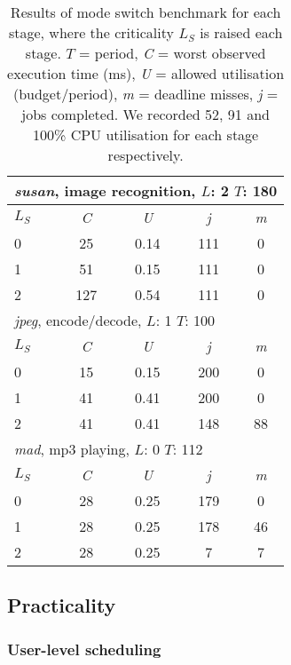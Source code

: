 \begin{table}[h]\centering
    \begin{tabular}{|l|c|c|c|c|}\hline
        \multicolumn{5}{|l|}{\textit{susan}, image recognition, \(L\): 2 \(T\): 180}\\\hline
        \textbf{\(L_S\)} & \textit{C} & \textit{U} & \textit{j} & \textit{m} \\\hline
                     0 & 25 & 0.14 & 111 & 0 \\\hline
                     1 & 51 & 0.15 & 111 & 0 \\\hline
                     2 & 127 & 0.54 & 111 & 0 \\\hline
        \multicolumn{5}{|l|}{\textit{jpeg}, encode/decode, \(L\): 1 \(T\): 100}\\\hline
        \textbf{\(L_S\)} & \textit{C} & \textit{U} & \textit{j} & \textit{m} \\\hline
                     0 & 15 & 0.15 & 200 & 0 \\\hline
                1 & 41 & 0.41 & 200 & 0 \\\hline
                     2 & 41 & 0.41 & 148 & 88 \\\hline
        \multicolumn{5}{|l|}{\textit{mad}, mp3 playing, \(L\): 0 \(T\): 112}\\\hline
        \textbf{\(L_S\)} & \textit{C} & \textit{U} & \textit{j} & \textit{m} \\\hline
                     0 & 28 & 0.25 & 179 & 0 \\\hline
                     1 & 28 & 0.25 & 178 & 46\\\hline
                     2 & 28 & 0.25 & 7 & 7 \\\hline
    \end{tabular}
    \caption{Results of mode switch benchmark for each
        stage, where the  criticality \(L_S\) is raised each stage. \(T\) =
        period, \textit{C} = worst observed execution time (ms),
      \textit{U} = allowed utilisation (budget/period),
    \textit{m} = deadline misses, \textit{j} = jobs completed. We recorded 52, 91 and 100\% CPU
utilisation for each stage respectively.}
    \label{t:modeswitch}
\end{table}


\subsection{Practicality}

\subsubsection{User-level scheduling}\label{s:edf-impl}

